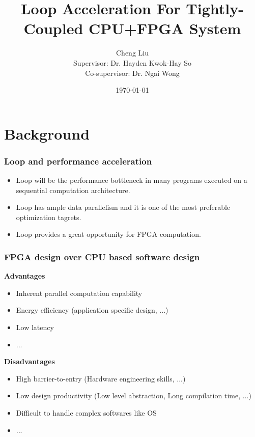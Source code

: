 \documentclass{beamer}
\title[]{Loop Acceleration For Tightly-Coupled CPU+FPGA System}
\author[]{
    Cheng Liu 
    \\Supervisor: Dr. Hayden Kwok-Hay So 
    \\Co-supervisor: Dr. Ngai Wong}
\institute {
    Department of Electrical and Electronic Engineering 
    \\The University of Hong Kong
\medskip
}
\date{\today} %
\begin{document}
\begin{frame}
\titlepage %
\end{frame}


\section{Background} 
\begin{frame}[t]
\frametitle{Loop and performance acceleration}
\begin{itemize}
\item Loop will be the performance bottleneck in many programs executed on a sequential computation architecture.
\item Loop has ample data parallelism and it is one of the most preferable optimization tagrets.
\item Loop provides a great opportunity for FPGA computation.
\end{itemize}
\end{frame}

\begin{frame}[t]
\frametitle{FPGA design over CPU based software design}

\textbf{Advantages}
\begin{itemize}
\item Inherent parallel computation capability
\item Energy efficiency (application specific design, ...)
\item Low latency
\item ...
\end{itemize}

\textbf{Disadvantages}
\begin{itemize}
\item High barrier-to-entry (Hardware engineering skills, ...)
\item Low design productivity (Low level abstraction, Long compilation time, ...)
\item Difficult to handle complex softwares like OS
\item ...
\end{itemize}

\end{frame}
\end{document}
